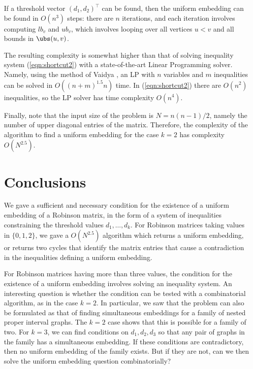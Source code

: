 \documentclass[runningheads]{llncs}
\begin{document}
If a threshold vector $(d_1,d_2)^\top$ can be found, then the uniform embedding can be found in $O(n^3)$ steps: there are $n$ iterations, and each iteration involves computing $lb_v$ and $ub_v$, which involves looping over all vertices $u<v$ and all bounds in $\ubs (u,v)$. 

The resulting complexity is somewhat higher than that of solving inequality system (\ref{eqn:shortcut2}) with a state-of-the-art Linear Programming solver. Namely, using the method of Vaidya \cite{Vaidya89} , an LP with $n$ variables and $m$ inequalities can be solved in $O((n+m)^{1.5} n)$ time. In (\ref{eqn:shortcut2}) there are $O(n^2)$ inequalities, so the LP solver has time complexity $O(n^{4})$.

Finally, note that the input size of the problem is $N=n(n-1)/2$, namely the number of upper diagonal entries of the matrix. Therefore, the complexity of the algorithm to find a uniform embedding for the case $k=2$ has complexity $O(N^{2.5})$. 



\section{Conclusions}

We gave a sufficient and necessary condition for the existence of a uniform embedding of a Robinson matrix, in the form of a system of inequalities constraining the threshold values $d_1,\dots ,d_k$. For Robinson matrices taking values in $\{ 0,1,2\}$, we gave a $O(N^{2.5})$ algorithm which returns a uniform embedding, or returns two cycles that identify the matrix entries that cause a contradiction in the inequalities defining a uniform embedding. 

For Robinson matrices having more than three values, the condition for the existence of a uniform embedding involves solving an inequality system. An interesting question is whether the condition can be tested with a combinatorial algorithm, as in the case $k=2$. In particular, we saw that the problem can also be formulated as that of finding simultaneous embeddings for a family of nested proper interval graphs. The $k=2$ case shows that this is possible for a family of two. For $k=3$, we can find conditions on $d_1,d_2,d_3$ so that any pair of graphs in the family has a simultaneous embedding. If these conditions are contradictory, then no uniform embedding of the family exists. But if they are not, can we then solve the uniform embedding question combinatorially?
\end{document}
